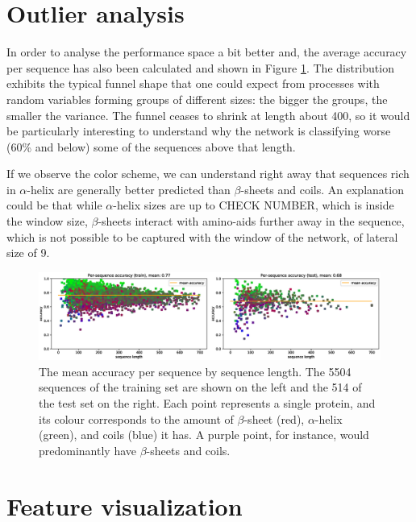 \section{Outlier analysis} \label{sect:outliers}

In order to analyse the performance space a bit better and, the average accuracy per sequence has also been calculated and shown in Figure \ref{fig:per_seq_acc}. The distribution exhibits the typical funnel shape that one could expect from processes with random variables forming groups of different sizes: the bigger the groups, the smaller the variance. The funnel ceases to shrink at length about 400, so it would be particularly interesting to understand why the network is classifying worse (60\% and below) some of the sequences above that length.

If we observe the color scheme, we can understand right away that sequences rich in $\alpha$-helix are generally better predicted than $\beta$-sheets and coils. An explanation could be that while $\alpha$-helix sizes are up to CHECK NUMBER, which is inside the window size, $\beta$-sheets interact with amino-aids further away in the sequence, which is not possible to be captured with the window of the network, of lateral size of 9.

\begin{figure}
\centering
\includegraphics[width=1\linewidth]{Figures/per_seq_acc}
\caption{The mean accuracy per sequence by sequence length. The 5504 sequences of the training set are shown on the left and the 514 of the test set on the right. Each point represents a single protein, and its colour corresponds to the amount of $\beta$-sheet (red), $\alpha$-helix (green), and coils (blue) it has. A purple point, for instance, would predominantly have $\beta$-sheets and coils.}
\label{fig:per_seq_acc}
\end{figure}

\section{Feature visualization}

